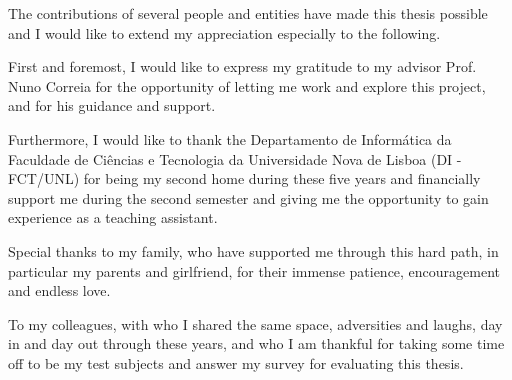 \acknowledgements

The contributions of several people and entities have made this thesis possible and I would like to extend my appreciation especially to the following.

First and foremost, I would like to express my gratitude to my advisor Prof. Nuno Correia for the opportunity of letting me work and explore this project, and for his guidance and support.

Furthermore, I would like to thank the Departamento de Informática da Faculdade de Ciências e Tecnologia da Universidade Nova de Lisboa (DI - FCT/UNL) for being my second home during these five years and financially support me during the second semester and giving me the opportunity to gain experience as a teaching assistant.

Special thanks to my family, who have supported me through this hard path, in particular my parents and girlfriend, for their immense patience, encouragement and endless love.

To my colleagues, with who I shared the same space, adversities and laughs, day in and day out through these years, and who I am thankful for taking some time off to be my test subjects and answer my survey for evaluating this thesis.